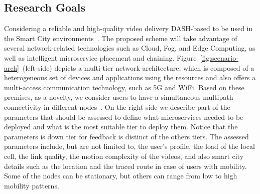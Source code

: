 
\subsection*{Research Goals}
\label{sec:research-goals}

Considering a reliable and high-quality video delivery DASH-based to be used in the Smart City environments~\cite{gamaUCC2019, KreuzbergerWorkshop2016}. The proposed scheme will take advantage of several network-related technologies such as Cloud, Fog, and Edge Computing, as well as intelligent microservice placement and chaining. Figure~\ref{fig:scenario-arch}~(left-side) depicts a multi-tier network architecture, which is composed of a heterogeneous set of devices and applications using the resources and also offers a multi-access communication technology, such as 5G and WiFi. Based on these premises, as a novelty, we consider users to have a simultaneous multipath connectivity in different nodes~\cite{poliakovPHD2018, Velasquez2018}.
On the right-side we describe part of the parameters that should be assessed to define what microservices needed to be deployed and what is the most suitable tier to deploy them. Notice that the parameters is down tier for feedback is distinct of the others tiers.
The assessed parameters include, but are not limited to, the user's profile, the load of the local cell, the link quality, the motion complexity of the videos, and also smart city details such as the location and the traced route in case of users with mobility. Some of the nodes can be stationary, but others can range from low to high mobility patterns. %

